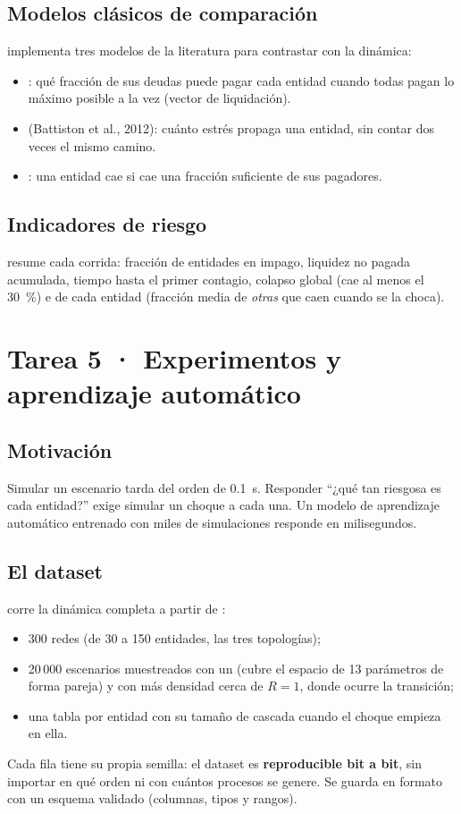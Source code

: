 \section{Modelos clásicos de comparación}
 implementa tres modelos de la literatura para
contrastar con la dinámica:
\begin{itemize}
\item {}: qué fracción de sus deudas puede pagar cada
entidad cuando todas pagan lo máximo posible a la vez (vector de liquidación).
\item {} (Battiston et al., 2012): cuánto estrés propaga una entidad, sin
contar dos veces el mismo camino.
\item {}: una entidad cae si cae una fracción suficiente de sus
pagadores.
\end{itemize}

\section{Indicadores de riesgo}
 resume cada corrida: fracción de entidades en impago,
liquidez no pagada acumulada, tiempo hasta el primer contagio, colapso global (cae al
menos el 30~\%) e  de cada entidad (fracción media de
\emph{otras} que caen cuando se la choca).

\chapter{Tarea 5 · Experimentos y aprendizaje automático}

\section{Motivación}
Simular un escenario tarda del orden de 0.1~s. Responder ``¿qué tan riesgosa es cada
entidad?'' exige simular un choque a cada una. Un modelo de aprendizaje automático
entrenado con miles de simulaciones responde en milisegundos.

\section{El dataset}
 corre la dinámica completa a partir de
:
\begin{itemize}
\item 300 redes (de 30 a 150 entidades, las tres topologías);
\item 20\,000 escenarios muestreados con un  (cubre el espacio
de 13 parámetros de forma pareja) y con más densidad cerca de $R=1$, donde ocurre la
transición;
\item una tabla por entidad con su tamaño de cascada cuando el choque empieza en ella.
\end{itemize}
Cada fila tiene su propia semilla: el dataset es \textbf{reproducible bit a bit}, sin
importar en qué orden ni con cuántos procesos se genere. Se guarda en formato
 con un esquema validado (columnas, tipos y rangos).

